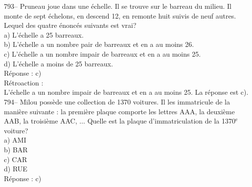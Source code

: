 ﻿\documentclass[letterpaper, 12pt]{article}
\begin{document}
793-- Pruneau joue dans une \'echelle.  Il se trouve sur le barreau du
milieu.  Il monte de sept \'echelons, en descend 12, en remonte huit suivis
de neuf autres.  Lequel des quatre \'enonc\'es suivants est vrai?\\
a) L'\'echelle a 25 barreaux.\\
b) L'\'echelle a un nombre pair de barreaux et en a au moins 26.\\
c) L'\'echelle a un nombre impair de barreaux et en a au moins 25.\\
d) L'\'echelle a moins de 25 barreaux.\\

R\'eponse : c)\\

R\'etroaction : \\
L'\'echelle a un nombre impair de barreaux et en a au moins 25.  La
r\'eponse est c).\\

794-- Milou poss\`ede une collection de 1370 voitures.  Il les immatricule
de la mani\`ere suivante : la premi\`ere plaque comporte les lettres AAA, la
deuxi\`eme AAB, la troisi\`eme AAC, $\ldots$  Quelle est la plaque
d'immatriculation de la 1370$^{\textrm{e}}$ voiture?\\
a) AMI\\
b) BAR\\
c) CAR\\
d) RUE\\

R\'eponse : c)\\
\end{document}
